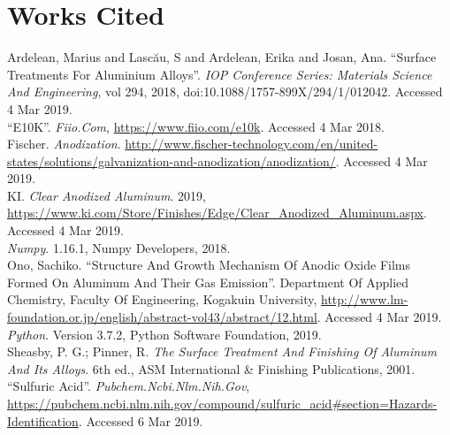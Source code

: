 \documentclass[a4paper]{article}
\begin{document}
\section*{Works Cited}
\begin{hangparas}{.25in}{1}
  \begin{sloppypar}
    Ardelean, Marius and Lascău, S and Ardelean, Erika and Josan, Ana.
    ``Surface Treatments For Aluminium Alloys''. \textit{IOP Conference Series:
    Materials Science And Engineering}, vol 294, 2018,
    doi:10.1088/1757-899X/294/1/012042.  Accessed 4 Mar 2019. \\

    ``E10K''. \textit{Fiio.Com}, \url{https://www.fiio.com/e10k}. Accessed 4
    Mar 2018. \\

    Fischer. \textit{Anodization}.
    \url{http://www.fischer-technology.com/en/united-states/solutions/galvanization-and-anodization/anodization/}.
    Accessed 4 Mar 2019. \\

    KI. \textit{Clear Anodized Aluminum}. 2019,
    \url{https://www.ki.com/Store/Finishes/Edge/Clear_Anodized_Aluminum.aspx}.
    Accessed 4 Mar 2019. \\

    \textit{Numpy}. 1.16.1, Numpy Developers, 2018. \\

    Ono, Sachiko. ``Structure And Growth Mechanism Of Anodic Oxide Films Formed
    On Aluminum And Their Gas Emission''. Department Of Applied Chemistry,
    Faculty Of Engineering, Kogakuin University,
    \url{http://www.lm-foundation.or.jp/english/abstract-vol43/abstract/12.html}.
    Accessed 4 Mar 2019. \\

    \textit{Python}. Version 3.7.2, Python Software Foundation, 2019. \\

    Sheasby, P. G.; Pinner, R. \textit{The Surface Treatment And Finishing Of
    Aluminum And Its Alloys}. 6th ed., ASM International \& Finishing
    Publications, 2001. \\

    ``Sulfuric Acid''. \textit{Pubchem.Ncbi.Nlm.Nih.Gov},
    \url{https://pubchem.ncbi.nlm.nih.gov/compound/sulfuric_acid#section=Hazards-Identification}.
    Accessed 6 Mar 2019. \\
  \end{sloppypar}
\end{hangparas}
\end{document}
